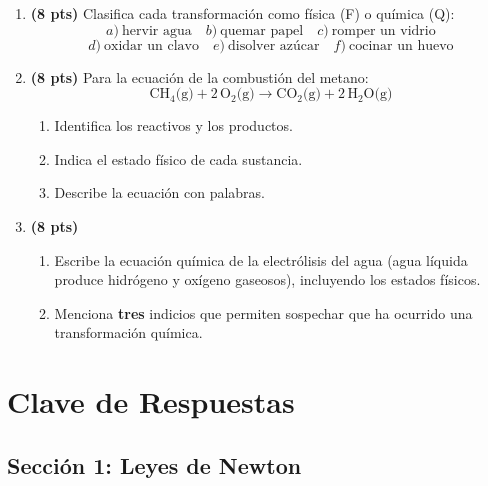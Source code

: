 \documentclass[12pt, letterpaper]{article}
\begin{document}
\begin{enumerate}[leftmargin=*]
  \item \textbf{(8 pts)} Clasifica cada transformación como física (F) o química (Q):
        \[
          a)\ \text{hervir agua} \quad b)\ \text{quemar papel} \quad c)\ \text{romper un vidrio}
        \]
        \[
          d)\ \text{oxidar un clavo} \quad e)\ \text{disolver azúcar} \quad f)\ \text{cocinar un huevo}
        \]

  \item \textbf{(8 pts)} Para la ecuación de la combustión del metano:
        \[
          \text{CH}_4\text{(g)} + 2\,\text{O}_2\text{(g)} \rightarrow \text{CO}_2\text{(g)} + 2\,\text{H}_2\text{O(g)}
        \]
        \begin{enumerate}[label=\alph*)]
          \item Identifica los reactivos y los productos.
          \item Indica el estado físico de cada sustancia.
          \item Describe la ecuación con palabras.
        \end{enumerate}

  \item \textbf{(8 pts)}
        \begin{enumerate}[label=\alph*)]
          \item Escribe la ecuación química de la electrólisis del agua (agua líquida produce hidrógeno y oxígeno gaseosos), incluyendo los estados físicos.
          \item Menciona \textbf{tres} indicios que permiten sospechar que ha ocurrido una transformación química.
        \end{enumerate}
\end{enumerate}

\newpage

\ifmwclaves
  \section{Clave de Respuestas}

  \subsection*{Sección 1: Leyes de Newton}
\end{document}
